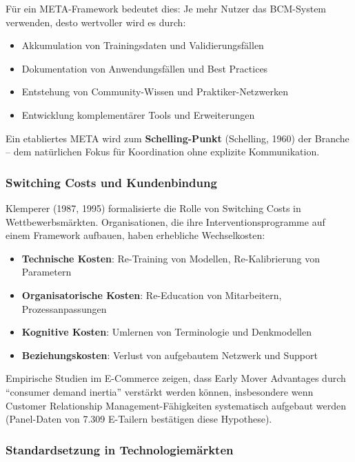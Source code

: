 Für ein META-Framework bedeutet dies: Je mehr Nutzer das BCM-System verwenden, desto wertvoller wird es durch:
\begin{itemize}
    \item Akkumulation von Trainingsdaten und Validierungsfällen
    \item Dokumentation von Anwendungsfällen und Best Practices
    \item Entstehung von Community-Wissen und Praktiker-Netzwerken
    \item Entwicklung komplementärer Tools und Erweiterungen
\end{itemize}

Ein etabliertes META wird zum \textbf{Schelling-Punkt} (Schelling, 1960) der Branche -- dem natürlichen Fokus für Koordination ohne explizite Kommunikation.

\subsubsection{Switching Costs und Kundenbindung}

Klemperer (1987, 1995) formalisierte die Rolle von Switching Costs in Wettbewerbsmärkten. Organisationen, die ihre Interventionsprogramme auf einem Framework aufbauen, haben erhebliche Wechselkosten:

\begin{itemize}
    \item \textbf{Technische Kosten}: Re-Training von Modellen, Re-Kalibrierung von Parametern
    \item \textbf{Organisatorische Kosten}: Re-Education von Mitarbeitern, Prozessanpassungen
    \item \textbf{Kognitive Kosten}: Umlernen von Terminologie und Denkmodellen
    \item \textbf{Beziehungskosten}: Verlust von aufgebautem Netzwerk und Support
\end{itemize}

Empirische Studien im E-Commerce zeigen, dass Early Mover Advantages durch ``consumer demand inertia'' verstärkt werden können, insbesondere wenn Customer Relationship Management-Fähigkeiten systematisch aufgebaut werden (Panel-Daten von 7.309 E-Tailern bestätigen diese Hypothese).

\subsubsection{Standardsetzung in Technologiemärkten}

